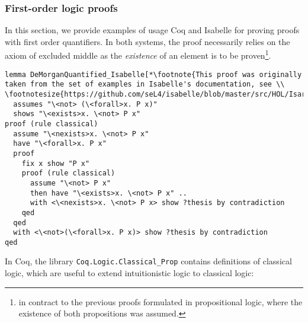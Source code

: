 \documentclass[article]{aaltoseries}
\begin{document}

\subsubsection{First-order logic proofs}

In this section, we provide examples of usage Coq and Isabelle for proving proofs with first order quantifiers. In both systems, the proof necessarily relies on the axiom of excluded middle as the \textit{existence} of an element is to be proven\footnote{in contract to the previous proofs formulated in propositional logic, where the existence of both propositions was assumed.}.



\begin{lstlisting}[language=isabelle, caption={Proof of the de Morgan's law for first-order propositions in Isabelle}, label={ex_morgan_quant_isabelle}]
lemma DeMorganQuantified_Isabelle[*\footnote{This proof was originally taken from the set of examples in Isabelle's documentation, see \\ \footnotesize{https://github.com/seL4/isabelle/blob/master/src/HOL/Isar\_Examples/Drinker.thy}}*]:
  assumes "\<not> (\<forall>x. P x)"
  shows "\<exists>x. \<not> P x"
proof (rule classical)
  assume "\<nexists>x. \<not> P x"
  have "\<forall>x. P x"
  proof
    fix x show "P x"
    proof (rule classical)
      assume "\<not> P x"
      then have "\<exists>x. \<not> P x" ..
      with <\<nexists>x. \<not> P x> show ?thesis by contradiction
    qed
  qed
  with <\<not>(\<forall>x. P x)> show ?thesis by contradiction
qed
\end{lstlisting}





In Coq, the library \texttt{Coq.Logic.Classical\_Prop} contains definitions of classical logic, which are useful to extend intuitionistic logic to classical logic:
\end{document}
